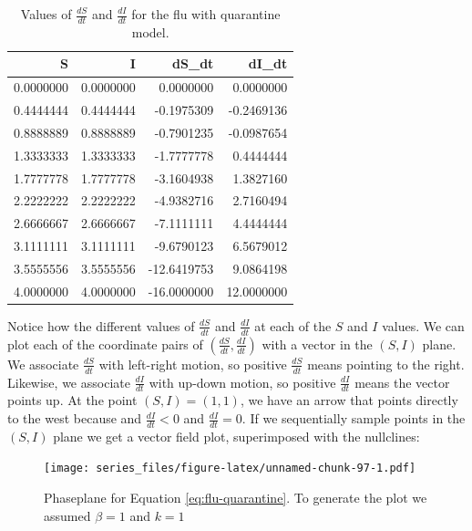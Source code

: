 \documentclass[
]{book}
\theoremstyle{definition}
\theoremstyle{definition}
\theoremstyle{definition}
\theoremstyle{remark}
\begin{document}
\begin{table}

\caption{\label{tab:unnamed-chunk-96}Values of $\frac{dS}{dt}$ and $\frac{dI}{dt}$ for the flu with quarantine model.}
\centering
\begin{tabular}[t]{r|r|r|r}
\hline
S & I & dS\_dt & dI\_dt\\
\hline
0.0000000 & 0.0000000 & 0.0000000 & 0.0000000\\
\hline
0.4444444 & 0.4444444 & -0.1975309 & -0.2469136\\
\hline
0.8888889 & 0.8888889 & -0.7901235 & -0.0987654\\
\hline
1.3333333 & 1.3333333 & -1.7777778 & 0.4444444\\
\hline
1.7777778 & 1.7777778 & -3.1604938 & 1.3827160\\
\hline
2.2222222 & 2.2222222 & -4.9382716 & 2.7160494\\
\hline
2.6666667 & 2.6666667 & -7.1111111 & 4.4444444\\
\hline
3.1111111 & 3.1111111 & -9.6790123 & 6.5679012\\
\hline
3.5555556 & 3.5555556 & -12.6419753 & 9.0864198\\
\hline
4.0000000 & 4.0000000 & -16.0000000 & 12.0000000\\
\hline
\end{tabular}
\end{table}

Notice how the different values of \(\displaystyle \frac{dS}{dt}\) and \(\displaystyle \frac{dI}{dt}\) at each of the \(S\) and \(I\) values. We can plot each of the coordinate pairs of \(\displaystyle \left( \frac{dS}{dt}, \frac{dI}{dt} \right)\) with a vector in the \((S,I)\) plane. We associate \(\displaystyle \frac{dS}{dt}\) with left-right motion, so positive \(\displaystyle \frac{dS}{dt}\) means pointing to the right. Likewise, we associate \(\displaystyle \frac{dI}{dt}\) with up-down motion, so positive \(\displaystyle \frac{dI}{dt}\) means the vector points up. At the point \((S,I)=(1,1)\), we have an arrow that points directly to the west because and \(\displaystyle \frac{dI}{dt} < 0\) and \(\displaystyle \frac{dI}{dt} =0\). If we sequentially sample points in the \((S,I)\) plane we get a vector field plot, superimposed with the nullclines:

\begin{figure}
\centering
\texttt{[image: series\_files/figure-latex/unnamed-chunk-97-1.pdf]}
\caption{\label{fig:unnamed-chunk-97}Phaseplane for Equation \eqref{eq:flu-quarantine}. To generate the plot we assumed \(\beta=1\) and \(k=1\)}
\end{figure}
\end{document}
